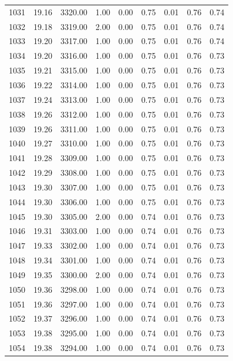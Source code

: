 \documentclass{article}\usepackage[]{graphicx}\usepackage[]{color}
\begin{document}
\begin{longtable}{rrrrrrrrr}
  1031 & 19.16 & 3320.00 & 1.00 & 0.00 & 0.75 & 0.01 & 0.76 & 0.74 \\ 
  1032 & 19.18 & 3319.00 & 2.00 & 0.00 & 0.75 & 0.01 & 0.76 & 0.74 \\ 
  1033 & 19.20 & 3317.00 & 1.00 & 0.00 & 0.75 & 0.01 & 0.76 & 0.74 \\ 
  1034 & 19.20 & 3316.00 & 1.00 & 0.00 & 0.75 & 0.01 & 0.76 & 0.73 \\ 
  1035 & 19.21 & 3315.00 & 1.00 & 0.00 & 0.75 & 0.01 & 0.76 & 0.73 \\ 
  1036 & 19.22 & 3314.00 & 1.00 & 0.00 & 0.75 & 0.01 & 0.76 & 0.73 \\ 
  1037 & 19.24 & 3313.00 & 1.00 & 0.00 & 0.75 & 0.01 & 0.76 & 0.73 \\ 
  1038 & 19.26 & 3312.00 & 1.00 & 0.00 & 0.75 & 0.01 & 0.76 & 0.73 \\ 
  1039 & 19.26 & 3311.00 & 1.00 & 0.00 & 0.75 & 0.01 & 0.76 & 0.73 \\ 
  1040 & 19.27 & 3310.00 & 1.00 & 0.00 & 0.75 & 0.01 & 0.76 & 0.73 \\ 
  1041 & 19.28 & 3309.00 & 1.00 & 0.00 & 0.75 & 0.01 & 0.76 & 0.73 \\ 
  1042 & 19.29 & 3308.00 & 1.00 & 0.00 & 0.75 & 0.01 & 0.76 & 0.73 \\ 
  1043 & 19.30 & 3307.00 & 1.00 & 0.00 & 0.75 & 0.01 & 0.76 & 0.73 \\ 
  1044 & 19.30 & 3306.00 & 1.00 & 0.00 & 0.75 & 0.01 & 0.76 & 0.73 \\ 
  1045 & 19.30 & 3305.00 & 2.00 & 0.00 & 0.74 & 0.01 & 0.76 & 0.73 \\ 
  1046 & 19.31 & 3303.00 & 1.00 & 0.00 & 0.74 & 0.01 & 0.76 & 0.73 \\ 
  1047 & 19.33 & 3302.00 & 1.00 & 0.00 & 0.74 & 0.01 & 0.76 & 0.73 \\ 
  1048 & 19.34 & 3301.00 & 1.00 & 0.00 & 0.74 & 0.01 & 0.76 & 0.73 \\ 
  1049 & 19.35 & 3300.00 & 2.00 & 0.00 & 0.74 & 0.01 & 0.76 & 0.73 \\ 
  1050 & 19.36 & 3298.00 & 1.00 & 0.00 & 0.74 & 0.01 & 0.76 & 0.73 \\ 
  1051 & 19.36 & 3297.00 & 1.00 & 0.00 & 0.74 & 0.01 & 0.76 & 0.73 \\ 
  1052 & 19.37 & 3296.00 & 1.00 & 0.00 & 0.74 & 0.01 & 0.76 & 0.73 \\ 
  1053 & 19.38 & 3295.00 & 1.00 & 0.00 & 0.74 & 0.01 & 0.76 & 0.73 \\ 
  1054 & 19.38 & 3294.00 & 1.00 & 0.00 & 0.74 & 0.01 & 0.76 & 0.73 \\ 

\end{longtable}
\end{document}
